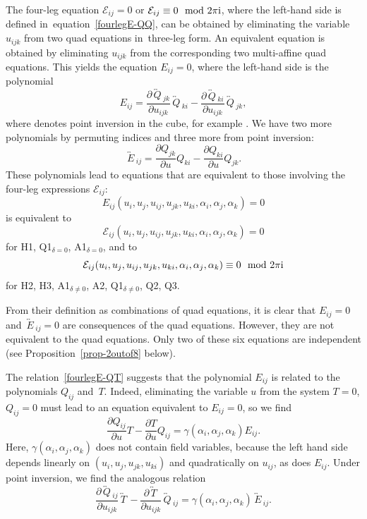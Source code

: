 \documentclass[pdftex]{sigma}
\newcommand{\inversion}[1]{\!\overleftrightarrow{\,#1\,}\!}
\newcommand{\pdv}[2]{\frac{\partial {#1}}{\partial {#2}}}
\numberwithin{equation}{section}
\begin{document}
The four-leg equation $\mathcal E_{ij} = 0$ or $\mathcal E_{ij} \equiv 0 \mod 2 \pi {\rm i}$, where the left-hand side is defined in~equation~\eqref{fourlegE-QQ}, can be obtained by eliminating the variable $u_{ijk}$ from two quad equations in~three-leg form. An equivalent equation is obtained by eliminating $u_{ijk}$ from the corresponding two multi-affine quad equations. This yields the equation $E_{ij} = 0$, where the left-hand side is the polynomial
\begin{equation}\label{E-Q}
 E_{ij} = \pdv{\inversion Q_{jk}}{u_{ijk}} \inversion{Q}_{ki} - \pdv{\inversion{Q}_{ki}}{u_{ijk}} \inversion{Q}_{jk} ,
\end{equation}
where \smash{$\inversion{\cdot}$} denotes point inversion in the cube, for example \smash{$\inversion Q_{jk} = Q(u_{ijk},u_{ki},u_{ij},u_{i},\alpha_j-\alpha_k)$}.
We have two more polynomials by permuting indices and three more from point inversion:
\begin{equation}
\label{E-Q-invert}
\inversion{E}_{ij} = \pdv{Q_{jk}}{u} Q_{ki} - \pdv{Q_{ki}}{u} Q_{jk} .
\end{equation}
These polynomials lead to equations that are equivalent to those involving the four-leg expressions $\mathcal{E}_{ij}$:
\[ E_{ij}(u_i,u_j,u_{ij},u_{jk},u_{ki},\alpha_i,\alpha_j,\alpha_k) = 0\]
is equivalent to
\[ \mathcal{E}_{ij}(u_i,u_j,u_{ij},u_{jk},u_{ki},\alpha_i,\alpha_j,\alpha_k) = 0 \]
for H1, Q1$_{\delta=0}$, A1$_{\delta=0}$, and to
\[ \mathcal{E}_{ij}(u_i,u_j,u_{ij},u_{jk},u_{ki},\alpha_i,\alpha_j,\alpha_k) \equiv 0 \mod 2 \pi {\rm i} \]
for H2, H3, A1$_{\delta\neq0}$, A2, Q1$_{\delta\neq0}$, Q2, Q3.

From their definition as combinations of quad equations, it is clear that $E_{ij}=0$ and $\inversion E_{ij}=0$ are consequences of the quad equations. However, they are not equivalent to the quad equations. Only two of these six equations are independent (see Proposition~\ref{prop-2outof8} below).

The relation~\eqref{fourlegE-QT} suggests that the polynomial $E_{ij}$ is related to the polynomials $Q_{ij}$ and~$T$. Indeed, eliminating the variable $u$ from the system $T=0$, $Q_{ij}=0$ must lead to an equation equivalent to $E_{ij} = 0$, so we find
\begin{equation}\label{TQE-rel}
 \pdv{Q_{ij}}{u} T - \pdv{T}{u} Q_{ij} = \gamma(\alpha_i,\alpha_j,\alpha_k) E_{ij} .
\end{equation}
Here, $\gamma(\alpha_i,\alpha_j,\alpha_k)$ does not contain field variables, because the left hand side depends linearly on $(u_i,u_j,u_{jk},u_{ki})$ and quadratically on $u_{ij}$, as does $E_{ij}$.
Under point inversion, we find the analogous relation
\begin{equation*} \pdv{\inversion Q_{ij}}{u_{ijk}} \inversion T - \pdv{\inversion T}{u_{ijk}} \inversion Q_{ij} = \gamma(\alpha_i,\alpha_j,\alpha_k) \inversion E_{ij} .
\end{equation*}
\end{document}
